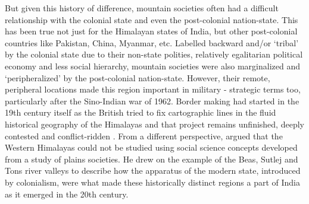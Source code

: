 But given this history of difference, mountain societies often had a difficult relationship with the colonial state and even the post\hyp{}colonial nation\hyp{}state. This has been true not just for the Himalayan states of India, but other post\hyp{}colonial countries like Pakistan, China, Myanmar, etc. Labelled backward and/or ‘tribal’ by the colonial state due to their non\hyp{}state polities, relatively egalitarian political economy and less social hierarchy, mountain societies were also marginalized and ‘peripheralized’ by the post\hyp{}colonial nation\hyp{}state. However, their remote, peripheral locations made this region important in military \hyp{} strategic terms too, particularly after the Sino\hyp{}Indian war of 1962. Border making had started in the 19th century itself as the British tried to fix cartographic lines in the fluid historical geography of the Himalayas and that project remains unfinished, deeply contested and conflict\hyp{}ridden \citep{noorani2010india,guyot2017shadow,acharya2022boundaries}. From a different perspective, \cite{alam2008becoming} argued that the Western Himalayas could not be studied using social science concepts developed from a study of plains societies. He drew on the example of the Beas, Sutlej and Tons river valleys to describe how the apparatus of the modern state, introduced by colonialism, were what made these historically distinct regions a part of India as it emerged in the 20th century.

